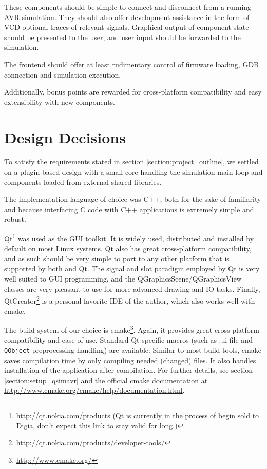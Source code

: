 These components should be simple to connect and disconnect from a running \ac{AVR}
simulation. They should also offer development assistance in the form of \ac{VCD}
optional traces of relevant signals. Graphical output of component state should
be presented to the user, and user input should be forwarded to the simulation.

The frontend should offer at least rudimentary control of firmware
loading, \ac{GDB} connection and simulation execution.

Additionally, bonus points are rewarded for cross-platform compatibility and
easy extensibility with new components.

\section{Design Decisions} \label{section:design_principles}

To satisfy the requirements stated in section \ref{section:project_outline},
we settled on a plugin based design with a small core handling the simulation main
loop and components loaded from external shared libraries.

The implementation language of choice was C++, both for the sake of familiarity
and because interfacing C code with C++ applications is extremely simple and
robust.

Qt\footnote{
%
\url{http://qt.nokia.com/products} (Qt is currently in the process of begin sold
to Digia, don't expect this link to stay valid for long.)
%
} was used as the \ac{GUI} toolkit. It is widely used, distributed and installed
by default on most Linux systems. Qt also has great cross-platform compatibility,
and as such \qsimavr should be very simple to port to any other platform that
is supported by both \simavr and Qt. The signal and slot paradigm employed by
Qt is very well suited to \ac{GUI} programming, and the
QGraphicsScene/QGraphicsView classes are very pleasant to use for more advanced
drawing and \ac{IO} tasks. Finally, QtCreator\footnote{
%
\url{http://qt.nokia.com/products/developer-tools/}
%
} is a personal favorite \ac{IDE} of
the author, which also works well with cmake.

The build system of our choice is cmake\footnote{\url{http://www.cmake.org/}}.
Again, it provides great cross-platform
compatibility and ease of use. Standard Qt specific macros (such as .ui file and
\lstinline|QObject| preprocessing handling) are available. Similar to most build tools, cmake
saves compilation time by only compiling needed (changed) files. It also handles
installation of the application after compilation. For further details, see
section \ref{section:setup_qsimavr} and the official cmake documentation at
\url{http://www.cmake.org/cmake/help/documentation.html}.


